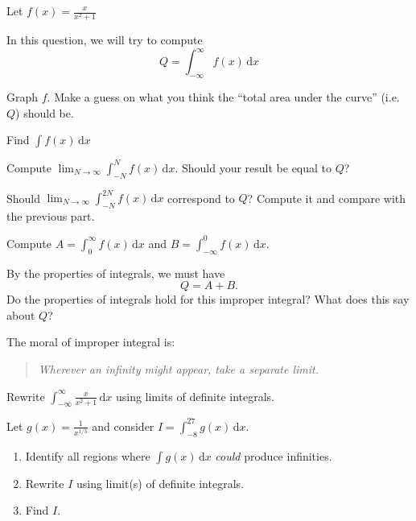 \documentclass{workbook}
\begin{document}
\begin{slide}
	\question
	Let $\displaystyle f(x)=\frac{x}{x^2+1}$

	In this question, we will try to compute
	\[
	Q=\int_{-\infty}^\infty f(x)\,\mathrm d x
	\]

	\begin{parts}
		\item Graph $f$. Make a guess on what you think the ``total area under the curve'' (i.e. $Q$) should be.
		\item Find $\displaystyle \int f(x)\,\mathrm d x$
		\item Compute $
		\displaystyle 
		\lim_{N\to\infty} \int_{-N}^N f(x)\,\mathrm d x
		$. Should your result be equal to $Q$?
		\item Should $
		\displaystyle 
		\lim_{N\to\infty} \int_{-N}^{2N} f(x)\,\mathrm d x
		$ correspond to $Q$? Compute it and compare with the previous part.

		\item Compute $A=\displaystyle \int_0^\infty f(x)\,\mathrm d x$
		and $B=\displaystyle \int_{-\infty}^0 f(x)\,\mathrm d x$.

		\item By the properties of integrals, we must have
		\[
			Q=A+B.
		\]
		Do the properties of integrals hold for this improper integral?
		What does this say about $Q$?
	\end{parts}
\end{slide}

\begin{slide}
	\question
	The moral of improper integral is:
	\begin{quote}
		\emph{Wherever an infinity might appear, take a separate limit.}
	\end{quote}

	\begin{parts}
		\item Rewrite 
		$\displaystyle \int_{-\infty}^\infty \frac{x}{x^2+1}\,\mathrm d x$
		using limits of definite integrals.
		\item Let $g(x)=\frac{1}{x^{1/3}}$ and consider 
		$I=\displaystyle \int_{-8}^{27} g(x)\,\mathrm d x$.

		\begin{enumerate}
			\item Identify all regions where $\displaystyle \int g(x)\,\mathrm d x$ \emph{could} produce infinities.
			\item Rewrite $I$ using limit(s) of definite integrals.
			\item Find $I$.
		\end{enumerate}
	\end{parts}

\end{slide}
\end{document}
